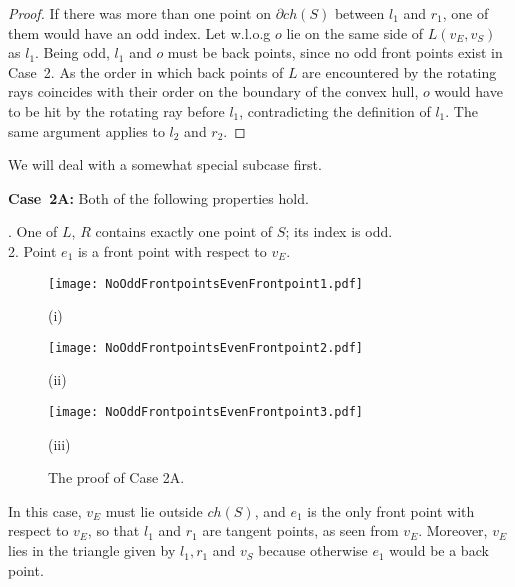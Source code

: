 \documentclass[11pt]{article}
\begin{document}
\begin{proof}
If there was more than one point on $\partial ch (S)$ between $l_1$ and $r_1$, 
one of them would have an odd index.
Let w.l.o.g $o$ lie on the same side of $L(v_E,v_S)$ as $l_1$. Being odd, $l_1$ and $o$ must be back points, since no
odd front points exist in Case~2.
As the order in which back points of $L$ are encountered by the rotating rays 
coincides with their order on the boundary of the convex hull,
$o$ would have to be hit by the rotating ray before $l_1$, contradicting the definition of $l_1$. 
The same argument applies to $l_2$ and $r_2$.
\end{proof}


We will deal with a somewhat special subcase first.
\vspace{0.5\baselineskip}

{\bf Case~2A:  } Both of the following properties hold.

. One of $L$, $R$ contains exactly one point of $S$; its index is odd.\\
2. Point $e_1$ is a front point with respect to $v_E$.


\begin{figure}[hbtp]\begin{minipage}[t]{0.28\textwidth}
\begin{center}\texttt{[image: NoOddFrontpointsEvenFrontpoint1.pdf]}

(i)
\end{center}\end{minipage}
\hfill
\begin{minipage}[t]{0.34\textwidth}
\begin{center}\texttt{[image: NoOddFrontpointsEvenFrontpoint2.pdf]}

(ii)
\end{center}\end{minipage}
\hfill
\begin{minipage}[t]{0.34\textwidth}
\begin{center}\texttt{[image: NoOddFrontpointsEvenFrontpoint3.pdf]}

(iii)
\end{center}\end{minipage}
\caption{The proof of Case 2A.}
\label{NoOddFrontpointsEvenFrontpoint-fig}
\end{figure}


In this case, $v_E$ must lie outside $ch(S)$, and $e_1$ is the only front point with respect to $v_E$, so that $l_1$ and $r_1$ 
are tangent points, as seen from $v_E$.  Moreover, $v_E$ lies in the triangle given by $l_1,r_1$ and $v_S$ 
because otherwise $e_1$ would be a back point.
\end{document}
